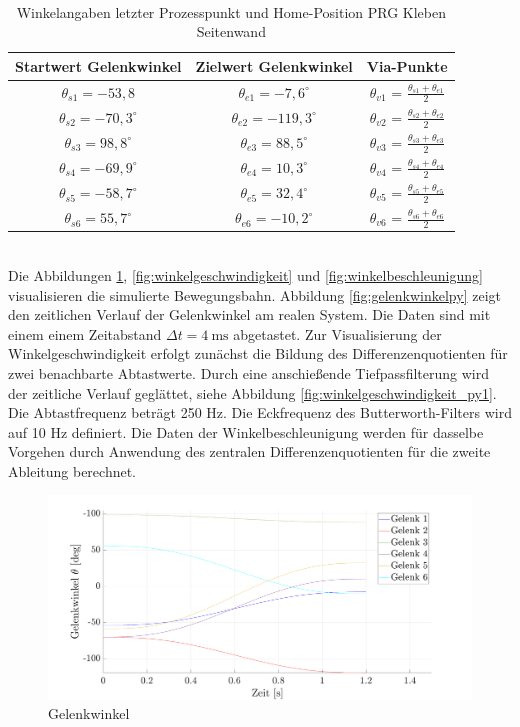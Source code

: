 \\
\begin{table}
\centering
\begin{tabular}{|c|c|c|}
	\hline
	Startwert Gelenkwinkel&  Zielwert Gelenkwinkel&  Via-Punkte\\
	\hline
	$\theta_{s1} = -53,8$&  $\theta_{e1} = -7,6^{\circ}$  &$\theta_{v1}$ = $\tfrac{\theta_{s1}+\theta_{e1}}{2}$  \\
	\hline
	$\theta_{s2} = -70,3^{\circ}$&  $\theta_{e2} = -119,3^{\circ}$    &$\theta_{v2}$ = $\tfrac{\theta_{s2}+\theta_{e2}}{2}$  \\
	\hline
	$\theta_{s3} = 98,8^{\circ}$&  $\theta_{e3} = 88,5^{\circ}$&$\theta_{v3}$ = $\tfrac{\theta_{s3}+\theta_{e3}}{2}$  \\
	\hline
	$\theta_{s4} = -69,9^{\circ}$&  $\theta_{e4} = 10,3^{\circ}$&$\theta_{v4}$ = $\tfrac{\theta_{s4}+\theta_{e4}}{2}$  \\
	\hline
	$\theta_{s5} = -58,7^{\circ}$&  $\theta_{e5} = 32,4^{\circ}$  &$\theta_{v5}$ = $\tfrac{\theta_{s5}+\theta_{e5}}{2}$  \\
	\hline
	$\theta_{s6} = 55,7^{\circ}$&  $\theta_{e6} = -10,2^{\circ}$&$\theta_{v6}$ = $\tfrac{\theta_{s6}+\theta_{e6}}{2}$  \\
	\hline
\end{tabular}
\caption{Winkelangaben letzter Prozesspunkt und Home-Position PRG Kleben Seitenwand}
\label{tab:simu}
\end{table}
\\
Die Abbildungen \ref{fig:gelenkwinkel}, \ref{fig:winkelgeschwindigkeit} und  \ref{fig:winkelbeschleunigung}  visualisieren die simulierte Bewegungsbahn. Abbildung \ref{fig:gelenkwinkelpy} zeigt den zeitlichen Verlauf der Gelenkwinkel am realen System. Die Daten sind mit einem einem  Zeitabstand $\Delta t = 4~\text{ms}$ abgetastet. Zur Visualisierung der Winkelgeschwindigkeit  erfolgt zunächst die Bildung des Differenzenquotienten für zwei benachbarte Abtastwerte. Durch eine anschießende Tiefpassfilterung wird der zeitliche Verlauf geglättet, siehe Abbildung \ref{fig:winkelgeschwindigkeit_py1}. Die Abtastfrequenz beträgt 250 Hz. Die Eckfrequenz des Butterworth-Filters wird auf 10 Hz definiert. Die Daten der Winkelbeschleunigung werden für dasselbe Vorgehen durch Anwendung des zentralen Differenzenquotienten für die zweite Ableitung berechnet.
%
\newpage
\begin{figure}[]
	\centering
	\includegraphics[width=1\linewidth]{images/gelenkwinkel}
	\caption{Gelenkwinkel}
	\label{fig:gelenkwinkel}
\end{figure}
